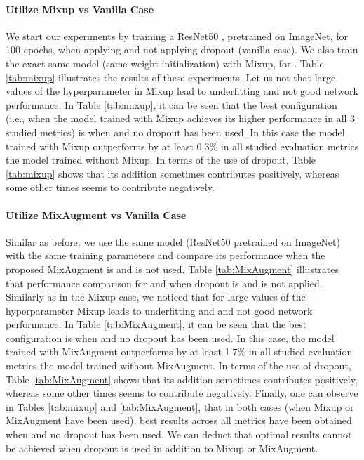 \documentclass[10pt,twocolumn,letterpaper]{article}
\begin{document}
\paragraph{Utilize Mixup vs Vanilla Case} We start our experiments by training a ResNet50 \cite{he2016deep}, pretrained on ImageNet, for 100 epochs, when applying and not applying dropout (vanilla case). We also train the exact same model (same weight initialization) with Mixup, for . Table \ref{tab:mixup} illustrates the results of these experiments. Let us not that  large values of the hyperparameter  in Mixup lead to underfitting and not good network performance. In Table \ref{tab:mixup}, it can be seen that the best configuration (i.e., when the model trained with Mixup achieves its higher performance in all 3 studied metrics) is  when  and no dropout has been used. In this case the model trained with Mixup outperforms by at least 0.3\% in all studied evaluation metrics the model trained without Mixup. In terms of the use of dropout, Table \ref{tab:mixup} shows that its addition sometimes contributes positively, whereas some other times seems to contribute negatively. 


\paragraph{Utilize MixAugment vs Vanilla Case} Similar as before, we use the same model (ResNet50 pretrained on ImageNet) with the same training parameters and compare its performance when the proposed MixAugment is and is not used. Table \ref{tab:MixAugment} illustrates that performance comparison for  and when dropout is and is not applied. Similarly as in the Mixup case, we noticed that for large values of the hyperparameter  Mixup leads to underfitting and and not good network performance. In Table \ref{tab:MixAugment}, it can be seen that the best configuration is when  and no dropout has been used. In this case, the model trained with MixAugment outperforms by at least 1.7\% in all studied evaluation metrics the model trained without MixAugment. In terms of the use of dropout, Table \ref{tab:MixAugment} shows that its addition sometimes contributes positively, whereas some other times seems to contribute negatively. 
Finally, one can observe in Tables  \ref{tab:mixup}  and  \ref{tab:MixAugment}, that in both cases (when Mixup or MixAugment have been used), best results across all metrics have been obtained when  and no dropout has been used. We can deduct that optimal results cannot be achieved when dropout is used in addition to Mixup or MixAugment. 
\end{document}
